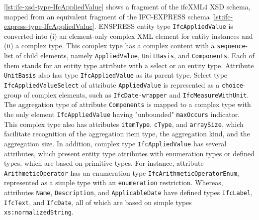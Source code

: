 \autoref{lst:ifc-xsd-type-IfcAppliedValue} shows a fragment of the ifcXML4 XSD schema, mapped from an equivalent fragment of the IFC-EXPRESS schema  \autoref{lst:ifc-express-type-IfcAppliedValue}.
ENSPRESS entity type \texttt{IfcAppliedValue} is converted into (i) an element-only complex XML element for entity instances and (ii) a complex type.
This complex type has a complex content with a \texttt{sequence}-list of child elements, namely \texttt{AppliedValue}, \texttt{UnitBasis}, and \texttt{Components}.
Each of them stands for an entity type attribute with a select or an entity type.
Attribute \texttt{UnitBasis} also has type \texttt{IfcAppliedValue} as its parent type.
Select type \texttt{IfcAppliedValueSelect} of attribute \texttt{AppliedValue} is represented as a \texttt{choice}-group of complex elements, such as \texttt{IfcDate-wrapper} and \texttt{IfcMeasureWithUnit}.
The aggregation type of attribute \texttt{Components} is mapped to a complex type with the only element \texttt{IfcAppliedValue} having "unbounded" \texttt{maxOccurs} indicator.
This complex type also has attributes \texttt{itemType}, \texttt{cType}, and \texttt{arraySize}, which facilitate recognition of the aggregation item type, the aggregation kind, and the aggregation size.
In addition, complex type \texttt{IfcAppliedValue} has several attributes, which present entity type attributes with enumeration types or defined types, which are based on primitive types.
For instance, attribute \texttt{ArithmeticOperator} has an enumeration type \texttt{IfcArithmeticOperatorEnum}, represented as a simple type with an \texttt{enumeration} restriction.
Whereas, attributes \texttt{Name}, \texttt{Description}, and \texttt{ApplicableDate} have defined types \texttt{IfcLabel}, \texttt{IfcText}, and \texttt{IfcDate}, all of which are based on simple types \texttt{xs:normalizedString}.



